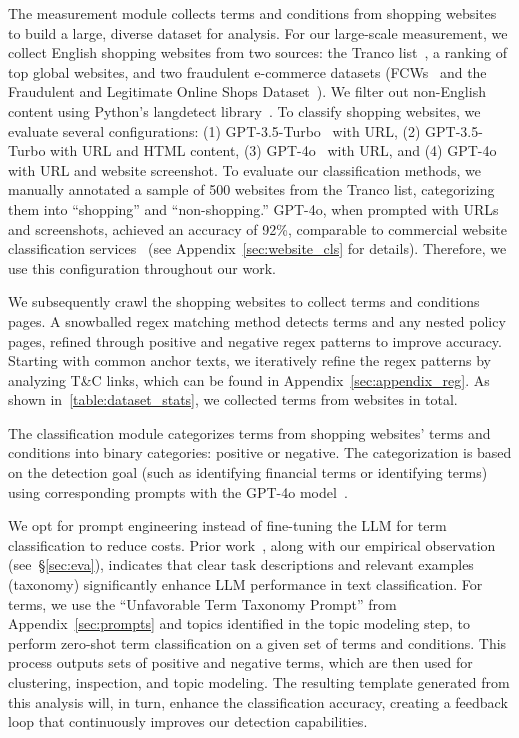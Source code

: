  The measurement module collects terms and conditions from shopping websites to build a large, diverse dataset for analysis. For our large-scale measurement, we collect English shopping websites from two sources: the Tranco list~\citep{tranco}, a ranking of top global websites, and two fraudulent e-commerce datasets (FCWs~\citep{bitaab2023beyond} and the Fraudulent and Legitimate Online Shops Dataset~\citep{janaviciute2023fraudulent}). We filter out non-English content using Python's langdetect library~\citep{langdetect}. To classify shopping websites, we evaluate several configurations: (1) GPT-3.5-Turbo~\citep{gpt35} with URL, (2) GPT-3.5-Turbo with URL and HTML content, (3) GPT-4o~\citep{openai2023gpt4} with URL, and (4) GPT-4o with URL and website screenshot. To evaluate our classification methods, we manually annotated a sample of 500 websites from the Tranco list, categorizing them into ``shopping'' and ``non-shopping.'' GPT-4o, when prompted with URLs and screenshots, achieved an accuracy of 92\%, comparable to commercial website classification services~\citep{mathur2019dark} (see Appendix~\ref{sec:website_cls} for details). Therefore, we use this configuration throughout our work.





We subsequently crawl the shopping websites to collect terms and conditions pages. A snowballed regex matching method detects terms and any nested policy pages, refined through positive and negative regex patterns to improve accuracy. Starting with common anchor texts, we iteratively refine the regex patterns by analyzing T\&C links, which can be found in Appendix~\ref{sec:appendix_reg}. As shown in~\autoref{table:dataset_stats}, we collected \termcnt terms from \websitecnt websites in total. 



The classification module categorizes terms from shopping websites' terms and conditions into binary categories: positive or negative. The categorization is based on the detection goal (such as identifying financial terms or identifying \termname terms) using corresponding prompts with the GPT-4o model~\citep{openai2023gpt4}.




We opt for prompt engineering instead of fine-tuning the LLM for term classification to reduce costs. Prior work~\citep{sun2023text,openai2023bestpractices}, along with our empirical observation (see~\S\ref{sec:eva}), indicates that clear task descriptions and relevant examples (taxonomy) significantly enhance LLM performance in text classification. For \termname terms, we use the ``Unfavorable Term Taxonomy Prompt'' from Appendix~\ref{sec:prompts} and topics identified in the topic modeling step, to perform zero-shot term classification on a given set of terms and conditions. This process outputs sets of positive and negative terms, which are then used for clustering, inspection, and topic modeling. The resulting template generated from this analysis will, in turn, enhance the classification accuracy, creating a feedback loop that continuously improves our detection capabilities. 

